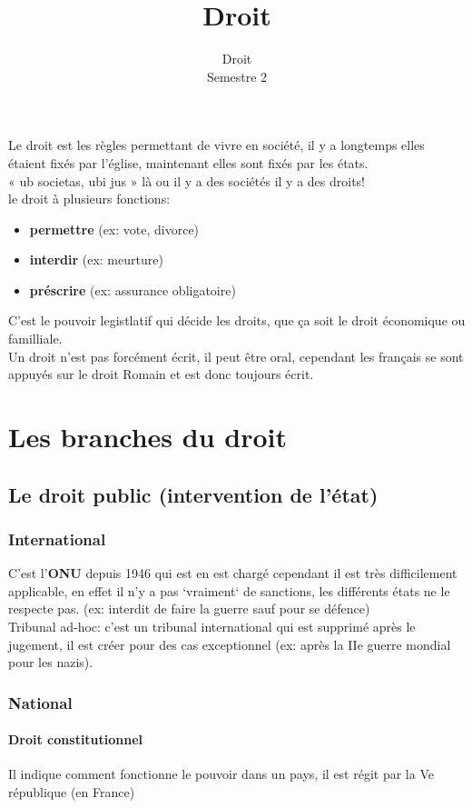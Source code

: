 \documentclass{article}
\title{Droit}
\date{Droit\\ Semestre 2}
\begin{document}
	\maketitle
	Le droit est les règles permettant de vivre en société, il y a longtemps elles étaient fixés par l'église, maintenant elles sont fixés par les états. \\
	« ub societas, ubi jus » là ou il y a des sociétés il y a des droits! \\
	le droit à plusieurs fonctions:
	\begin{itemize}	
		\item \textbf{permettre} (ex: vote, divorce)
		\item \textbf{interdir} (ex: meurture)
		\item \textbf{préscrire} (ex: assurance obligatoire)
	\end{itemize}
	C'est le pouvoir legistlatif qui décide les droits, que ça soit le droit économique ou familliale. \\
	Un droit n'est pas forcément écrit, il peut être oral, cependant les français se sont appuyés sur le droit Romain et est donc toujours écrit.

	\section{Les branches du droit}
		\subsection{Le droit public (intervention de l'état)}
			\subsubsection{International}
				C'est l'\textbf{ONU} depuis 1946 qui est en est chargé cependant il est très difficilement applicable, en effet il n'y a pas `vraiment` de sanctions, les différents états ne le respecte pas. 
					(ex: interdit de faire la guerre sauf pour se défence)\\
				Tribunal ad-hoc: c'est un tribunal international qui est supprimé après le jugement, il est créer pour des cas exceptionnel (ex: après la IIe guerre mondial pour les nazis).
			\subsubsection{National}
				\paragraph{Droit constitutionnel}
					Il indique comment fonctionne le pouvoir dans un pays, il est régit par la Ve république (en France)
\end{document}
